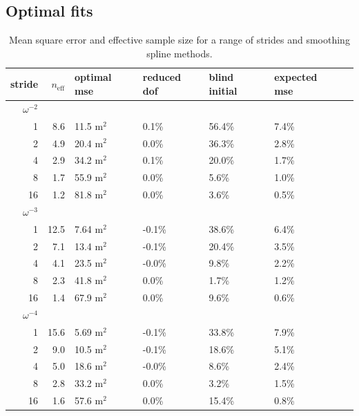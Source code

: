 \documentclass{ametsoc}
\begin{document}
\subsection{Optimal fits}
\label{subsec:optimal_fits}
\begin{table}[ht]
\caption{Mean square error and effective sample size for a range of strides and smoothing spline methods. 
}
\label{fit_results_gaussian}
\centering
\begin{tabular}{r r p{1cm} | p{1cm}p{1cm}p{1cm}p{1cm}} stride & $n_\textrm{eff}$ & optimal mse & reduced dof & blind initial & expected mse \\ \hline \hline 
$\omega^{-2}$ &&&&&  \\ \hline 
1 & 8.6 & 11.5 m$^2$ &  0.1\%  &  56.4\%  &  7.4\%  \\ 
2 & 4.9 & 20.4 m$^2$ &  0.0\%  &  36.3\%  &  2.8\%  \\ 
4 & 2.9 & 34.2 m$^2$ &  0.1\%  &  20.0\%  &  1.7\%  \\ 
8 & 1.7 & 55.9 m$^2$ &  0.0\%  &  5.6\%  &  1.0\%  \\ 
16 & 1.2 & 81.8 m$^2$ &  0.0\%  &  3.6\%  &  0.5\%  \\ 
$\omega^{-3}$ &&&&&  \\ \hline 
1 & 12.5 & 7.64 m$^2$ &  -0.1\%  &  38.6\%  &  6.4\%  \\ 
2 & 7.1 & 13.4 m$^2$ &  -0.1\%  &  20.4\%  &  3.5\%  \\ 
4 & 4.1 & 23.5 m$^2$ &  -0.0\%  &  9.8\%  &  2.2\%  \\ 
8 & 2.3 & 41.8 m$^2$ &  0.0\%  &  1.7\%  &  1.2\%  \\ 
16 & 1.4 & 67.9 m$^2$ &  0.0\%  &  9.6\%  &  0.6\%  \\ 
$\omega^{-4}$ &&&&&  \\ \hline 
1 & 15.6 & 5.69 m$^2$ &  -0.1\%  &  33.8\%  &  7.9\%  \\ 
2 & 9.0 & 10.5 m$^2$ &  -0.1\%  &  18.6\%  &  5.1\%  \\ 
4 & 5.0 & 18.6 m$^2$ &  -0.0\%  &  8.6\%  &  2.4\%  \\ 
8 & 2.8 & 33.2 m$^2$ &  0.0\%  &  3.2\%  &  1.5\%  \\ 
16 & 1.6 & 57.6 m$^2$ &  0.0\%  &  15.4\%  &  0.8\%  \\ 
\end{tabular} 
\end{table}
\end{document}
